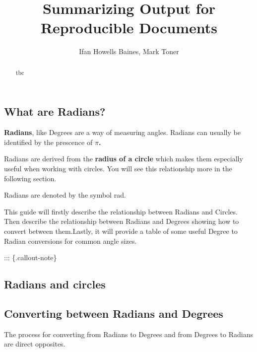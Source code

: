 \documentclass[
  12pt,
  a4paper, oneside]{starmastarticle}
\title{Summarizing Output for Reproducible Documents}
\author{Ifan Howells Baines, Mark Toner}
\date{}
\begin{document}
\maketitle
\begin{abstract}
tbc
\end{abstract}
\ifdefined\Shaded\renewenvironment{Shaded}{\begin{tcolorbox}[interior hidden, borderline west={3pt}{0pt}{shadecolor}, sharp corners, frame hidden, boxrule=0pt, breakable, enhanced]}{\end{tcolorbox}}\fi

\hypertarget{what-are-radians}{%
\subsection*{What are Radians?}\label{what-are-radians}}

\textbf{Radians}, like Degrees are a way of measuring angles. Radians
can usually be identified by the prescence of \textbf{\(\pi\).}

Radians are derived from the \textbf{radius of a circle} which makes
them especially useful when working with circles. You will see this
relationship more in the following section.

Radians are denoted by the symbol rad.

This guide will firstly describe the relationship between Radians and
Circles. Then describe the relationship between Radians and Degrees
showing how to convert between them.Lastly, it will provide a table of
some useful Degree to Radian conversions for common angle sizes.

::: \{.callout-note\}

\hypertarget{radians-and-circles}{%
\subsection{Radians and circles}\label{radians-and-circles}}

\hypertarget{converting-between-radians-and-degrees}{%
\subsection{Converting between Radians and
Degrees}\label{converting-between-radians-and-degrees}}

The process for converting from Radians to Degrees and from Degrees to
Radians are direct opposites.
\end{document}
